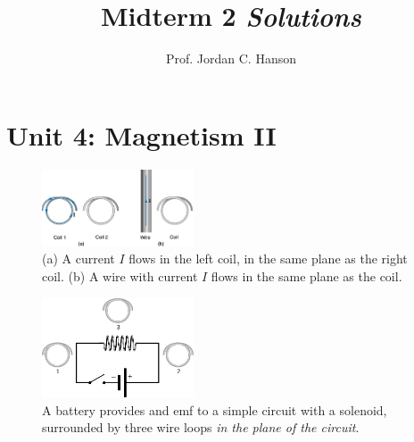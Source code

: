 \documentclass[12pt,twocolumn]{article}
\title{Midterm 2 \textit{Solutions}}
\author{Prof. Jordan C. Hanson}
\begin{document}
\maketitle
\small

\section{Unit 4: Magnetism II}

\begin{figure}
\centering
\includegraphics[width=0.4\textwidth]{B-flux.jpeg}
\caption{\label{fig:B-flux} \small (a) A current $I$ flows in the left coil, in the same plane as the right coil. (b) A wire with current $I$ flows in the same plane as the coil.}
\end{figure}
\begin{figure}
\centering
\includegraphics[width=0.4\textwidth]{awesome.jpeg}
\caption{\label{fig:B-flux2} \small A battery provides and emf to a simple circuit with a solenoid, surrounded by three wire loops \textit{in the plane of the circuit}.}
\end{figure}
\end{document}
